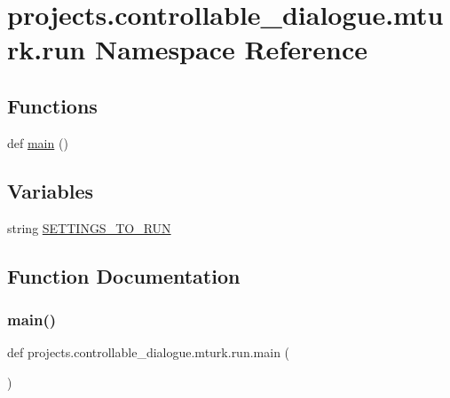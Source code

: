 \hypertarget{namespaceprojects_1_1controllable__dialogue_1_1mturk_1_1run}{}\section{projects.\+controllable\+\_\+dialogue.\+mturk.\+run Namespace Reference}
\label{namespaceprojects_1_1controllable__dialogue_1_1mturk_1_1run}
\subsection*{Functions}
\begin{DoxyCompactItemize}
\item 
def \hyperlink{namespaceprojects_1_1controllable__dialogue_1_1mturk_1_1run_a535cc92a62da8a5bd2541bac398e3c14}{main} ()
\end{DoxyCompactItemize}
\subsection*{Variables}
\begin{DoxyCompactItemize}
\item 
string \hyperlink{namespaceprojects_1_1controllable__dialogue_1_1mturk_1_1run_a5996aeef52e934b6e6a5edbde47f1a25}{S\+E\+T\+T\+I\+N\+G\+S\+\_\+\+T\+O\+\_\+\+R\+UN}
\end{DoxyCompactItemize}


\subsection{Function Documentation}
\mbox{\label{namespaceprojects_1_1controllable__dialogue_1_1mturk_1_1run_a535cc92a62da8a5bd2541bac398e3c14}} 
\subsubsection{\texorpdfstring{main()}{main()}}
{\footnotesize\ttfamily def projects.\+controllable\+\_\+dialogue.\+mturk.\+run.\+main (\begin{DoxyParamCaption}{ }\end{DoxyParamCaption})}

